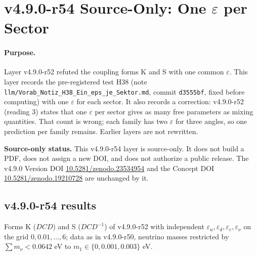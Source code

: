 \clearpage
\section*{v4.9.0-r54 Source-Only: One \texorpdfstring{\(\varepsilon\)}{epsilon} per Sector}
\label{sec:v490-r54-eps-per-sector}

\paragraph{Purpose.}
Layer v4.9.0-r52 refuted the coupling forms K and S with one common \(\varepsilon\).  This layer records the pre-registered test H38 (note
\texttt{llm/Vorab\_Notiz\_H38\_Ein\_eps\_je\_Sektor.md}, commit \texttt{d3555bf}, fixed before computing) with one \(\varepsilon\) for each sector.
It also records a correction: v4.9.0-r52 (reading 3) states that one \(\varepsilon\) per sector gives as many free parameters as mixing quantities.
That count is wrong; each family has two \(\varepsilon\) for three angles, so one prediction per family remains.  Earlier layers are not rewritten.

\noindent\textbf{Source-only status.}
This v4.9.0-r54 layer is source-only.  It does not build a PDF, does not assign a new DOI,
and does not authorize a public release.  The v4.9.0 Version DOI
\href{https://doi.org/10.5281/zenodo.23534954}{10.5281/zenodo.23534954} and the Concept DOI
\href{https://doi.org/10.5281/zenodo.19210728}{10.5281/zenodo.19210728} are unchanged by it.

\subsection*{v4.9.0-r54 results}
\label{subsec:v490-r54-results}

Forms K (\(DCD\)) and S (\(DCD^{-1}\)) of v4.9.0-r52 with independent \(\varepsilon_u,\varepsilon_d,\varepsilon_e,\varepsilon_\nu\) on the grid
\(0,0.01,\dots,6\); data as in v4.9.0-r50, neutrino masses restricted by \(\sum m_\nu<0.0642\) eV to \(m_1\in\{0,0.001,0.003\}\) eV.

